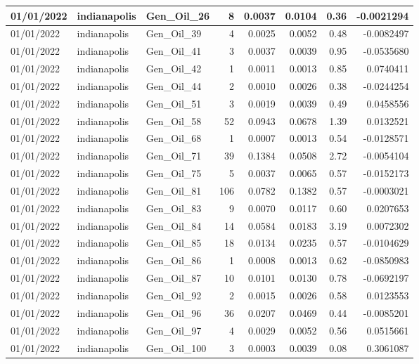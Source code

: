 \documentclass[
  letterpaper,
  DIV=11,
  numbers=noendperiod]{scrartcl}
\begin{document}
\begin{tabular}{l|l|l|r|r|r|r|r}
\hline
01/01/2022 & indianapolis & Gen\_Oil\_26 & 8 & 0.0037 & 0.0104 & 0.36 & -0.0021294\\
\hline
01/01/2022 & indianapolis & Gen\_Oil\_39 & 4 & 0.0025 & 0.0052 & 0.48 & -0.0082497\\
\hline
01/01/2022 & indianapolis & Gen\_Oil\_41 & 3 & 0.0037 & 0.0039 & 0.95 & -0.0535680\\
\hline
01/01/2022 & indianapolis & Gen\_Oil\_42 & 1 & 0.0011 & 0.0013 & 0.85 & 0.0740411\\
\hline
01/01/2022 & indianapolis & Gen\_Oil\_44 & 2 & 0.0010 & 0.0026 & 0.38 & -0.0244254\\
\hline
01/01/2022 & indianapolis & Gen\_Oil\_51 & 3 & 0.0019 & 0.0039 & 0.49 & 0.0458556\\
\hline
01/01/2022 & indianapolis & Gen\_Oil\_58 & 52 & 0.0943 & 0.0678 & 1.39 & 0.0132521\\
\hline
01/01/2022 & indianapolis & Gen\_Oil\_68 & 1 & 0.0007 & 0.0013 & 0.54 & -0.0128571\\
\hline
01/01/2022 & indianapolis & Gen\_Oil\_71 & 39 & 0.1384 & 0.0508 & 2.72 & -0.0054104\\
\hline
01/01/2022 & indianapolis & Gen\_Oil\_75 & 5 & 0.0037 & 0.0065 & 0.57 & -0.0152173\\
\hline
01/01/2022 & indianapolis & Gen\_Oil\_81 & 106 & 0.0782 & 0.1382 & 0.57 & -0.0003021\\
\hline
01/01/2022 & indianapolis & Gen\_Oil\_83 & 9 & 0.0070 & 0.0117 & 0.60 & 0.0207653\\
\hline
01/01/2022 & indianapolis & Gen\_Oil\_84 & 14 & 0.0584 & 0.0183 & 3.19 & 0.0072302\\
\hline
01/01/2022 & indianapolis & Gen\_Oil\_85 & 18 & 0.0134 & 0.0235 & 0.57 & -0.0104629\\
\hline
01/01/2022 & indianapolis & Gen\_Oil\_86 & 1 & 0.0008 & 0.0013 & 0.62 & -0.0850983\\
\hline
01/01/2022 & indianapolis & Gen\_Oil\_87 & 10 & 0.0101 & 0.0130 & 0.78 & -0.0692197\\
\hline
01/01/2022 & indianapolis & Gen\_Oil\_92 & 2 & 0.0015 & 0.0026 & 0.58 & 0.0123553\\
\hline
01/01/2022 & indianapolis & Gen\_Oil\_96 & 36 & 0.0207 & 0.0469 & 0.44 & -0.0085201\\
\hline
01/01/2022 & indianapolis & Gen\_Oil\_97 & 4 & 0.0029 & 0.0052 & 0.56 & 0.0515661\\
\hline
01/01/2022 & indianapolis & Gen\_Oil\_100 & 3 & 0.0003 & 0.0039 & 0.08 & 0.3061087\\

\end{tabular}
\end{document}
